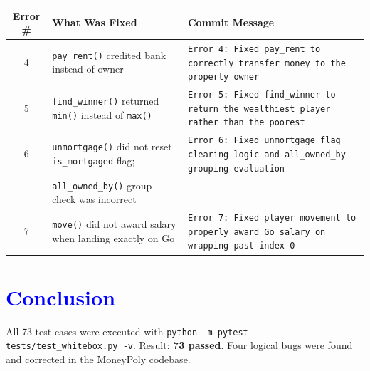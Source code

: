 \documentclass{article}
\begin{document}
\begin{center}
\begin{tabular}{cll}
\toprule
Error \# & What Was Fixed & Commit Message \\
\midrule
4 & \texttt{pay\_rent()} credited bank instead of owner & \texttt{Error 4: Fixed pay\_rent to correctly transfer money to the property owner} \\
5 & \texttt{find\_winner()} returned \texttt{min()} instead of \texttt{max()} & \texttt{Error 5: Fixed find\_winner to return the wealthiest player rather than the poorest} \\
6 & \texttt{unmortgage()} did not reset \texttt{is\_mortgaged} flag; & \texttt{Error 6: Fixed unmortgage flag clearing logic and all\_owned\_by grouping evaluation} \\
  & \texttt{all\_owned\_by()} group check was incorrect & \\
7 & \texttt{move()} did not award salary when landing exactly on Go & \texttt{Error 7: Fixed player movement to properly award Go salary on wrapping past index 0} \\
\bottomrule
\end{tabular}
\end{center}

\section*{\textcolor{blue}{Conclusion}}
All 73 test cases were executed with \texttt{python -m pytest tests/test\_whitebox.py -v}.
Result: \textbf{73 passed}. Four logical bugs were found and corrected in the MoneyPoly codebase.
\end{document}
